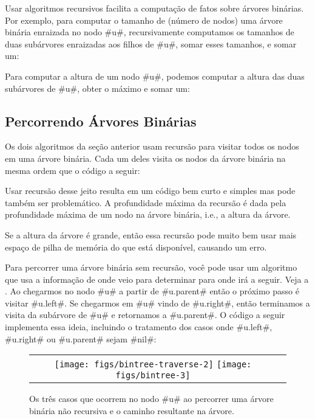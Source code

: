 %
Usar algoritmos recursivos facilita a computação de fatos sobre árvores 
binárias. Por exemplo, para computar o tamanho de (número de nodos)
uma árvore binária enraizada no nodo #u#, recursivamente computamos
os tamanhos de duas subárvores enraizadas aos filhos de #u#, somar esses tamanhos, e somar um:


Para computar a altura de um nodo 
#u#, podemos computar a altura das duas subárvores de #u#, obter o máximo e somar um:


\subsection{Percorrendo Árvores Binárias}

%
%
%
Os dois algoritmos da seção anterior usam recursão para visitar
todos os nodos em uma árvore binária. Cada um deles visita os nodos
da árvore binária na mesma ordem que o código a seguir:

Usar recursão desse jeito resulta em um código bem curto e simples mas
pode também ser problemático. A profundidade máxima da recursão é dada
pela profundidade máxima de um nodo na árvore binária, i.e., a altura
da árvore.

Se a altura da árvore é grande, então essa recursão pode muito bem usar 
mais espaço de pilha de memória do que está disponível, causando um erro.

Para percorrer uma árvore binária sem recursão, você pode usar um algoritmo 
que usa a informação de onde veio para determinar para onde irá a seguir.
Veja a .  
Ao chegarmos no nodo #u# a partir de #u.parent# então o próximo passo
é visitar #u.left#. Se chegarmos em #u# vindo de #u.right#, então
terminamos a visita da subárvore de #u# e retornamos a #u.parent#.
O código a seguir implementa essa ideia, incluindo o tratamento dos
casos onde #u.left#, #u.right# ou #u.parent# sejam #nil#:

\begin{figure}
  \begin{center}
    \begin{tabular}{cc}
      \texttt{[image: figs/bintree-traverse-2]}
      \texttt{[image: figs/bintree-3]}
    \end{tabular}
  \end{center}
  \caption[Percorrendo uma BinaryTree]{Os três casos que ocorrem no nodo #u# ao percorrer uma árvore binária não recursiva e o caminho resultante na árvore.}
\end{figure}

